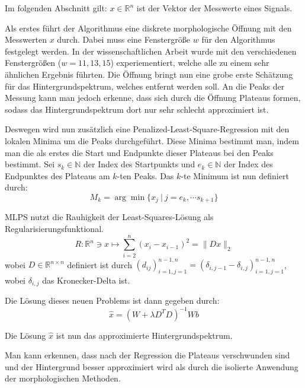 \documentclass{article}
\newcommand{\R}[0]{\mathbb{R}}
\newcommand{\N}[0]{\mathbb{N}}
\begin{document}
Im folgenden Abschnitt gilt: $x \in \R^n$ ist der Vektor der Messwerte eines Signals. 

Als erstes führt der Algorithmus eine diskrete morphologische Öffnung mit den Messwerten $x$ durch. Dabei muss eine Fenstergröße $w$ für den Algorithmus festgelegt werden.
In der wissenschaftlichen Arbeit wurde mit den verschiedenen Fenstergrößen ($w=11,13,15$) experiementiert, welche alle zu einem sehr ähnlichen Ergebnis führten.
Die Öffnung bringt nun eine grobe erste Schätzung für das Hintergrundspektrum, welches entfernt werden soll.
An die Peaks der Messung kann man jedoch erkenne, dass sich durch die Öffnung Plateaus formen, sodass das Hintergrundspektrum dort nur sehr schlecht approximiert ist.

Deswegen wird nun zusätzlich eine Penalized-Least-Square-Regression mit den lokalen Minima um die Peaks durchgeführt.
Diese Minima bestimmt man, indem man die als erstes die Start und Endpunkte dieser Plateaus bei den Peaks bestimmt.
Sei $s_k \in \N$ der Index des Startpunkts und $e_k \in \N$ der Index des Endpunktes des Plateaus am $k$-ten Peaks. Das $k$-te Minimum ist nun definiert durch:
\begin{equation}
    M_k = \arg\min \{x_j \: | \: j=e_k,\cdots s_{k+1}\}
\end{equation}

MLPS nutzt die Rauhigkeit der Least-Squares-Lösung als Regularisierungsfunktional.
\begin{equation}
    R: \R^n \ni x \mapsto \sum_{i=2}^{n} (x_i - x_{i-1})^2 = \lVert Dx \rVert_2
\end{equation}
wobei $D \in \R^{n\times n}$ definiert ist durch $(d_{ij})_{i=1,j=1}^{n-1,n} = (\delta_{i,j-1} - \delta_{i,j})_{i=1,j=1}^{n-1,n}$, wobei $\delta_{i,j}$ das Kronecker-Delta ist.

Die Lösung dieses neuen Problems ist dann gegeben durch:
\begin{equation}
    \hat{x} = (W + \lambda D^TD)^{-1}Wb
\end{equation}

Die Lösung $\hat{x}$ ist nun das approximierte Hintergrundspektrum.

Man kann erkennen, dass nach der Regression die Plateaus verschwunden sind und der Hintergrund besser approximiert wird als durch die isolierte Anwendung der morphologischen Methoden. 
\end{document}
